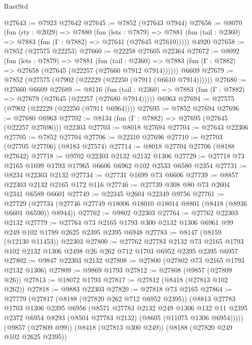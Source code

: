 \begin{lexlean}{RustStd}
\begin{coremodule}
@27643 := @7923 @27642
@27645 := @7852 (@27643 @7944)
@27656 := @8070
    (fun (rty : @2029) =>
    @7880
      (fun (lets : @7879) =>
      @7881 (fun (tail : @2360) => @7883 (fun (Γ : @7882) => @27641 (@27645 @27610)))))
    @4920
@27658 := @7852 (@27575 @22253)
@27660 := @22258 @27605 @22364
@27672 := @8092
    (fun (lets : @7879) =>
    @7881
      (fun (tail : @2360) =>
      @7883 (fun (Γ : @7882) => @27658 (@27645 (@22257 (@27660 @7912 @7914))))))
    @6609
@27679 := @7852 (@27575 (@7902 (@22229 (@22250 (@7911 (@6610 @7914))))))
@27680 := @27660 @6609
@27689 := @8116
    (fun (tail : @2360) => @7883 (fun (Γ : @7882) => @27679 (@27645 (@22257 (@27680 @7914)))))
    @6963
@27694 := @27575 (@7902 (@22229 (@22250 (@7911 @6964))))
@27695 := @7852 @27694
@27696 := @27680 @6963
@27702 := @8134 (fun (Γ : @7882) => @27695 (@27645 (@22257 @27696))) @22303
@27703 := @8018 @27694
@27704 := @27643 @22306
@27705 := @7852 @27704
@27706 := @22310 @27696
@27710 := @27703 (@27705 @27706) (@8183 @27574)
@27714 := @8018 @27704 @27706 (@8188 @27642)
@27718 := @9702 @22303 @2132 @2132 @1306
@27729 := @27718 @73 @2165 @1699 @1793 @17965 @6606 @6962 @102 @2533 @6580 @2354
@27731 := @8234 @22303 @2132
@27734 := @27731 @1699 @73 @6606
@27739 := @8857 @22303 @2132 @2165 @172 @116
@27746 := @27739 @308 @80 @73 @2604 @2341 @6589 @6601
@27749 := @22345 @2604 @22349 @9756
@27761 := @27729
    (@27734 (@27746 @27749 @18006 @18010 @18014 @8801 (@8418 (@8936 @6601 @6590)) @8944))
@27762 := @9802 @22303
@27764 := @27762 @22303 @2132
@27779 := @27764 @73 @2165 @1793 @300 @2132 @1306 @6961 @99 @249 @102 @1789 @2625 @2395 @2395 @6948
@27783 := @8147 (@8159 (@12130 @11453)) @22303
@27800 := @27762
    @27783
    @2132
    @73
    @2165
    @1793
    @102
    @2132
    @1306
    @2498
    @26
    @262
    @712
    @1703
    @6952
    @2395
    @2395
    @6957
@27802 := @9847 @22303 @2132
@27808 := @27800 (@27802 @73 @2165 @1793 @2132 @1306)
@27809 := @9869 @1793
@27812 := @27808 (@9857 (@27809 @26))
@27813 := @18072 @1793
@27817 := @27812 (@8418 (@27813 @102 @262))
@27818 := @9883 @22303
@27820 := @27818 @73 @2165
@27864 := @27779
    (@27817
      (@8188 (@27820 @262 @712 @6952 @2395))
      (@8813
        @27783
        @1703
        @1306
        @2395
        @6956
        (@8571
          @27783
          @2132
          @249
          @1306
          @132
          @11
          @2395
          @2372
          @6954
          @8293
          (@8504 @27783 @2132)
          (@8605 (@11075 @1306 @6954)))))
    (@9857 (@27809 @99))
    (@8418 (@27813 @300 @249))
    (@8188 (@27820 @249 @102 @2625 @2395))

\end{coremodule}
\end{lexlean}
